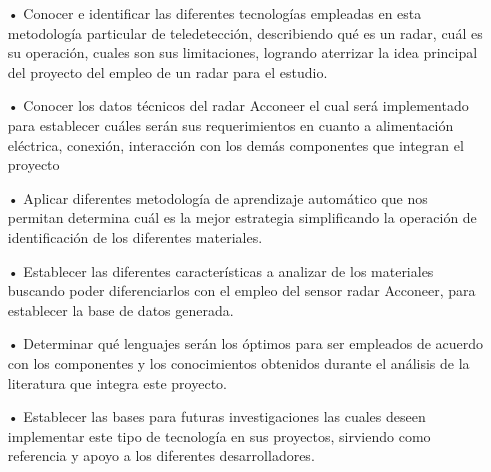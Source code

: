 \begin{itemize}
\item[•] Conocer e identificar las diferentes tecnologías empleadas en esta metodología particular de teledetección, describiendo qué es un radar, cuál es su operación, cuales son sus limitaciones, logrando aterrizar la idea principal del proyecto del empleo de un radar para el estudio.

\item[•] Conocer los datos técnicos del radar Acconeer el cual será implementado para establecer cuáles serán sus requerimientos en cuanto a alimentación eléctrica, conexión, interacción con los demás componentes que integran el proyecto

\item[•] Aplicar diferentes metodología de aprendizaje automático que nos permitan determina cuál es la mejor estrategia simplificando la operación de identificación de los diferentes materiales.

\item[•] Establecer las diferentes características a analizar de los materiales buscando poder diferenciarlos con el empleo del sensor radar Acconeer, para establecer la base de datos generada.

\item[•] Determinar qué lenguajes serán los óptimos para ser empleados de acuerdo con los componentes y los conocimientos obtenidos durante el análisis de la literatura que integra este proyecto.


\item[•] Establecer las bases para futuras investigaciones las cuales deseen implementar este tipo de tecnología en sus proyectos, sirviendo como referencia y apoyo a los diferentes desarrolladores.

\end{itemize}